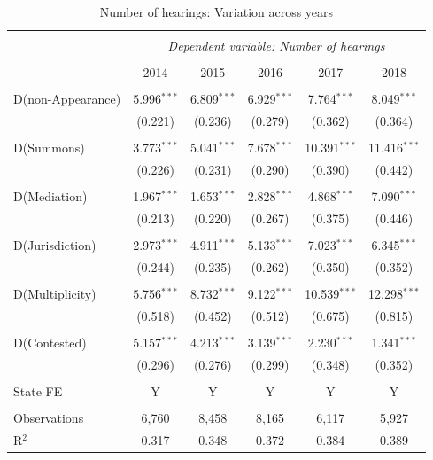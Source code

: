 \documentclass[12pt,a4paper]{article}
\begin{document}
\begin{appendices}
 {\footnotesize \begin{longtable}{lcc|ccc} 
 \caption{Number of hearings: Variation across years}\label{tab:hearFE} 
 \\[-1.8ex] 
 \hline \\[-1.8ex] 
 & \multicolumn{5}{c}{\textit{Dependent variable: Number of hearings}} \\ 
 \cline{2-6} 
 \\[-1.8ex] & 2014 & 2015 & 2016 & 2017 & 2018 \\ 
 \hline \\[-1.8ex] 
 D(non-Appearance) & 5.996$^{***}$ & 6.809$^{***}$ & 6.929$^{***}$ & 7.764$^{***}$ & 8.049$^{***}$ \\ 
 & (0.221) & (0.236) & (0.279) & (0.362) & (0.364) \\ 
 & & & & & \\ 
 D(Summons) & 3.773$^{***}$ & 5.041$^{***}$ & 7.678$^{***}$ & 10.391$^{***}$ & 11.416$^{***}$ \\ 
 & (0.226) & (0.231) & (0.290) & (0.390) & (0.442) \\ 
 & & & & & \\ 
 D(Mediation) & 1.967$^{***}$ & 1.653$^{***}$ & 2.828$^{***}$ & 4.868$^{***}$ & 7.090$^{***}$ \\ 
 & (0.213) & (0.220) & (0.267) & (0.375) & (0.446) \\ 
 & & & & & \\ 
 D(Jurisdiction) & 2.973$^{***}$ & 4.911$^{***}$ & 5.133$^{***}$ & 7.023$^{***}$ & 6.345$^{***}$ \\ 
 & (0.244) & (0.235) & (0.262) & (0.350) & (0.352) \\ 
 & & & & & \\ 
 D(Multiplicity) & 5.756$^{***}$ & 8.732$^{***}$ & 9.122$^{***}$ & 10.539$^{***}$ & 12.298$^{***}$ \\ 
 & (0.518) & (0.452) & (0.512) & (0.675) & (0.815) \\ 
 & & & & & \\ 
 D(Contested) & 5.157$^{***}$ & 4.213$^{***}$ & 3.139$^{***}$ & 2.230$^{***}$ & 1.341$^{***}$ \\ 
 & (0.296) & (0.276) & (0.299) & (0.348) & (0.352) \\ 
 \hline \\[-1.8ex]
 State FE & Y & Y & Y & Y & Y \\
 \hline \\[-1.8ex] 
 Observations & 6,760 & 8,458 & 8,165 & 6,117 & 5,927 \\ 
 R$^{2}$ & 0.317 & 0.348 & 0.372 & 0.384 & 0.389 \\ 

\end{longtable}}
\end{appendices}
\end{document}
